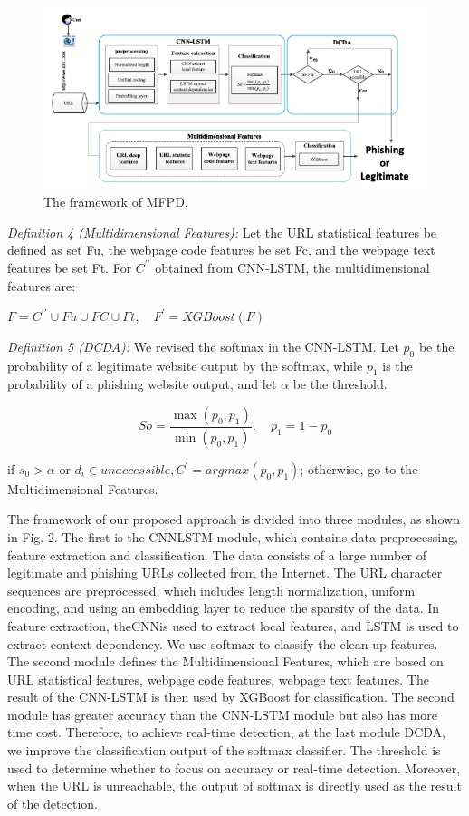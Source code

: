 \documentclass{ieeeaccess}
\begin{document}
\begin{figure}[ht]
        \centering
        \includegraphics[width=\linewidth]{figure2.png}
        \caption{The framework of MFPD.}
        \label{fig:2}
    \end{figure}
\par \textit{Definition 4 (Multidimensional Features):} Let the URL
statistical features be defined as set Fu, the webpage code
features be set Fc, and the webpage text features be set Ft. For $C^{\prime \prime}$ obtained from CNN-LSTM, the multidimensional
features are: \vspace{2pt} \par
$F=C^{\prime \prime} \cup F u \cup F C \cup F t, \quad F^{\prime}=X G B o o s t(F)$
\par \textit{Definition 5 (DCDA):} We revised the softmax in the
CNN-LSTM. Let $p_{0}$ be the probability of a legitimate website
output by the softmax, while $p_{1}$ is the probability of a
phishing website output, and let $\alpha$ be the threshold.\par
\begin{equation}
S o=\frac{\max \left(p_{0}, p_{1}\right)}{\min \left(p_{0}, p_{1}\right)}, \quad p_{1}=1-p_{0}
\end{equation}
\par if $s_{0} > {\alpha}$ or $d_{i} {\in} unaccessible, C^{\prime} = arg max(p_{0}, p_{1})$; otherwise, go to the Multidimensional Features.\par
The framework of our proposed approach is divided into
three modules, as shown in Fig. 2. The first is the CNNLSTM
module, which contains data preprocessing, feature
extraction and classification. The data consists of a large
number of legitimate and phishing URLs collected from the
Internet. The URL character sequences are preprocessed,
which includes length normalization, uniform encoding, and
using an embedding layer to reduce the sparsity of the data.
In feature extraction, theCNNis used to extract local features,
and LSTM is used to extract context dependency. We use
softmax to classify the clean-up features. The second module
defines the Multidimensional Features, which are based on
URL statistical features, webpage code features, webpage
text features. The result of the CNN-LSTM is then used by
XGBoost for classification. The second module has greater
accuracy than the CNN-LSTM module but also has more time cost. Therefore, to achieve real-time detection, at the last
module DCDA, we improve the classification output of the
softmax classifier. The threshold is used to determine whether
to focus on accuracy or real-time detection. Moreover, when
the URL is unreachable, the output of softmax is directly used
as the result of the detection.
\end{document}
